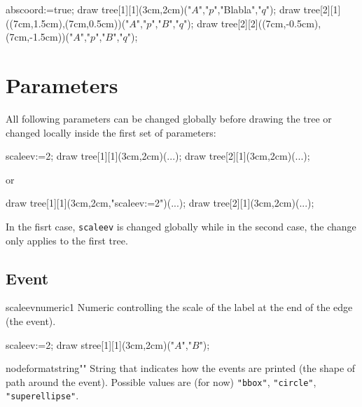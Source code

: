\documentclass[11pt,a4paper,english]{article}
\begin{document}

\begin{exemple}
abscoord:=true;
draw tree[1][1](3cm,2cm)("$A$","$p$","Blabla","$q$");
draw tree[2][1]((7cm,1.5cm),(7cm,0.5cm))("$A$","$p$","$B$","$q$");
draw tree[2][2]((7cm,-0.5cm),(7cm,-1.5cm))("$A$","$p$","$B$","$q$");
\end{exemple}


\section{Parameters}

All following parameters can be changed globally before drawing the tree or changed locally inside the first set of parameters:

\begin{codempost}[width=0.7\linewidth,left skip=1cm]
scaleev:=2;
draw tree[1][1](3cm,2cm)(...);
draw tree[2][1](3cm,2cm)(...);
\end{codempost}

or

\begin{codempost}[width=0.7\linewidth,left skip=1cm]
draw tree[1][1](3cm,2cm,"scaleev:=2")(...);
draw tree[2][1](3cm,2cm)(...);
\end{codempost}

In the fisrt case, \verb|scaleev| is changed globally while in the second case, the change only applies to the first tree.

 
\subsection{Event}

\begin{mptparam}{scaleev}{numeric}{1}
Numeric controlling the scale of the label at the end of the edge (the event).
\end{mptparam}


\begin{exemple}[lefthand ratio=0.65]
 scaleev:=2;
 draw stree[1][1](3cm,2cm)("$A$","$B$");
\end{exemple}

\begin{mptparam}{nodeformat}{string}{""}
String that indicates how the events are printed (the shape of path around the event). Possible values are (for now) \verb|"bbox"|, \verb|"circle"|, \verb|"superellipse"|.
\end{mptparam}
\end{document}
